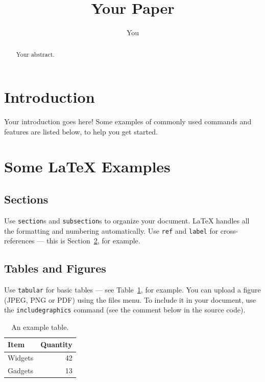 \documentclass[twocolumn,showpacs,%
  nofootinbib,aps,superscriptaddress,%
  eqsecnum,prd,notitlepage,showkeys,10pt]{revtex4-1}
\begin{document}
\title{Your Paper}
\author{You}

\begin{abstract}
Your abstract.
\end{abstract}

\maketitle

\section{Introduction}

Your introduction goes here! Some examples of commonly used commands and features are listed below, to help you get started.

\section{Some \LaTeX{} Examples}
\label{sec:examples}

\subsection{Sections}

Use \texttt{section}s and \texttt{subsection}s to organize your document. \LaTeX{} handles all the formatting and numbering automatically. Use \texttt{ref} and \texttt{label} for cross-references --- this is Section~\ref{sec:examples}, for example.

\subsection{Tables and Figures}

Use \texttt{tabular} for basic tables --- see Table~\ref{tab:widgets}, for example. You can upload a figure (JPEG, PNG or PDF) using the files menu. To include it in your document, use the \texttt{includegraphics} command (see the comment below in the source code).


\begin{table}
\centering
\begin{tabular}{l|r}
Item & Quantity \\\hline
Widgets & 42 \\
Gadgets & 13
\end{tabular}
\caption{\label{tab:widgets}An example table.}
\end{table}
\end{document}

